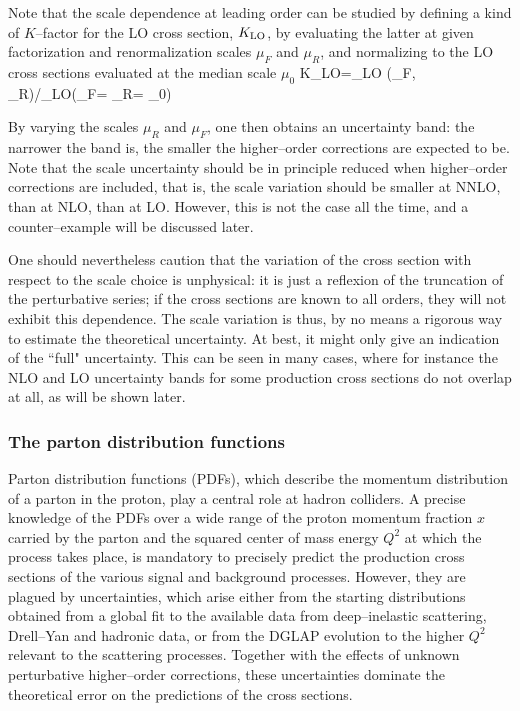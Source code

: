 Note that the scale dependence at leading order can be studied by defining a 
kind of $K$--factor for the LO cross section, $K_{\rm LO}$, by  evaluating the 
latter at given factorization and renormalization scales $\mu_F$ and $\mu_R$, 
and normalizing to the LO cross sections evaluated at the median  scale $\mu_0$
\beq
K_{\rm LO}=\sigma_{\rm LO} (\mu_F, \mu_R)/\sigma_{\rm LO}(\mu_F= \mu_R= \mu_0)
\eeq

By varying the scales $\mu_R$ and $\mu_F$, one then obtains an uncertainty 
band: the narrower the band is, the smaller the higher--order corrections 
are expected to be. Note that the scale uncertainty should be in principle
reduced when higher--order corrections are  included, that is, the scale 
variation should be smaller at NNLO, than at NLO, than at LO. However, this is 
not the case all the time, and a counter--example  will be discussed 
later. \s

One should nevertheless caution that the variation of the cross section with
respect to the scale choice is unphysical: it is just a reflexion of the
truncation of the perturbative series; if the cross sections are  known to all
orders, they will not exhibit this dependence. The scale variation is thus, by 
no means a rigorous way to estimate the theoretical uncertainty. At best,  it
might only give an indication of the ``full" uncertainty. This
can be seen in many cases, where for instance the NLO and LO uncertainty
bands for some production cross sections do not overlap at all, as will be  
shown later. 

\vspace*{-2mm}
\subsubsection{The parton distribution functions}

Parton distribution functions (PDFs), which describe the momentum distribution
of a parton in the proton,  play a central role at hadron colliders.  A precise
knowledge of the PDFs over a wide range of the proton momentum fraction $x$
carried by the parton and the squared center of mass energy $Q^2$ at which the
process takes place, is mandatory to precisely predict the production cross
sections of the various signal and background processes. However, they
are plagued by uncertainties, which arise either from the starting
distributions obtained from a global fit  to the available data from
deep--inelastic scattering, Drell--Yan and hadronic data, or from the DGLAP
evolution \cite{apsplit,DGLAP} to the higher $Q^2$ relevant to the scattering
processes.  Together with the effects of unknown perturbative higher--order
corrections, these uncertainties dominate the theoretical error on the
predictions of the cross sections.\s

